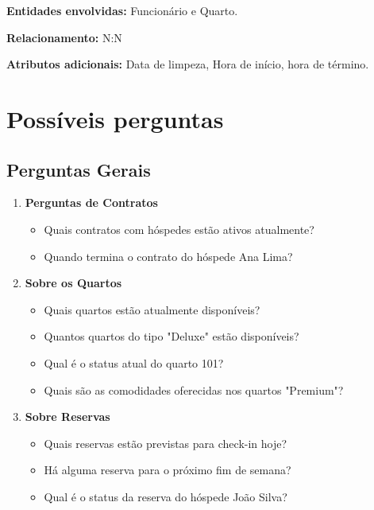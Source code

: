 
\textbf{Entidades envolvidas: }Funcionário e Quarto.

\textbf{Relacionamento: } N:N

\textbf{Atributos adicionais: }Data de limpeza, Hora de início, hora de término.

\newpage

\section{Possíveis perguntas}
\subsection{Perguntas Gerais}
\begin{enumerate}
    \item \textbf{Perguntas de Contratos}
    \begin{itemize}
        \item Quais contratos com hóspedes estão ativos atualmente?
        \item Quando termina o contrato do hóspede Ana Lima?
    \end{itemize}
    \item \textbf{Sobre os Quartos}
    \begin{itemize}
        \item Quais quartos estão atualmente disponíveis?
        \item Quantos quartos do tipo "Deluxe" estão disponíveis?
        \item Qual é o status atual do quarto 101?
        \item Quais são as comodidades oferecidas nos quartos "Premium"?
    \end{itemize}
    \item \textbf{Sobre Reservas}
    \begin{itemize}
        \item Quais reservas estão previstas para check-in hoje?
        \item Há alguma reserva para o próximo fim de semana?
        \item Qual é o status da reserva do hóspede João Silva?
    \end{itemize}
\end{enumerate}

